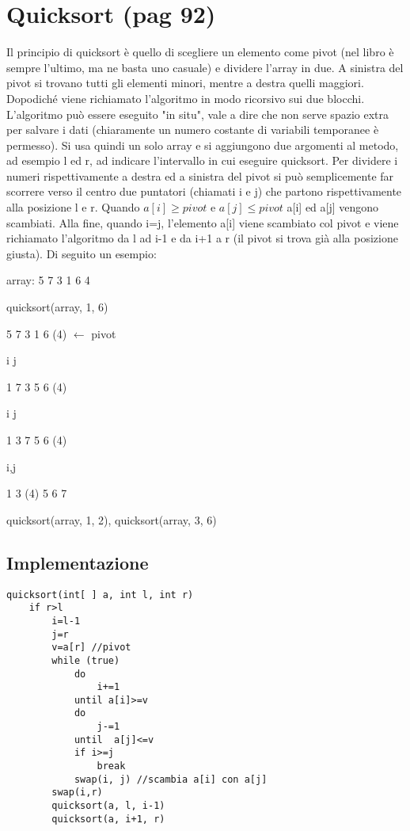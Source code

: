 \documentclass[a4paper]{book}
\begin{document}
\section{Quicksort (pag 92)}
Il principio di quicksort è quello di scegliere un elemento come pivot (nel libro è sempre l'ultimo, ma ne basta uno casuale) e dividere l'array in due. A sinistra del pivot si trovano tutti gli elementi minori, mentre a destra quelli maggiori. Dopodiché viene richiamato l'algoritmo in modo ricorsivo sui due blocchi. L'algoritmo può essere eseguito "in situ", vale a dire che non serve spazio extra per salvare i dati (chiaramente un numero costante di variabili temporanee è permesso). Si usa quindi un solo array e si aggiungono due argomenti al metodo, ad esempio l ed r, ad indicare l'intervallo in cui eseguire quicksort. Per dividere i numeri rispettivamente a destra ed a sinistra del pivot si può semplicemente far scorrere verso il centro due puntatori (chiamati i e j) che partono rispettivamente alla posizione l e r. Quando $a[i] \geq pivot$ e $a[j] \leq pivot$ a[i] ed a[j] vengono scambiati. Alla fine, quando i=j, l'elemento a[i] viene scambiato col pivot e viene richiamato l'algoritmo da l ad i-1 e da i+1 a r (il pivot si trova già alla posizione giusta). Di seguito un esempio:

array: 5 7 3 1 6 4

quicksort(array, 1, 6)

5 7 3 1 6 (4) $\leftarrow$ pivot

i\hspace{2em}       j 

1 7 3 5 6 (4)

\hspace{0.8em}  i j
  
1 3 7 5 6 (4)

\hspace{1,3em}   i,j
   
1 3 (4) 5 6 7

quicksort(array, 1, 2), quicksort(array, 3, 6)
      
\subsection*{Implementazione}

\begin{lstlisting}
quicksort(int[ ] a, int l, int r)
	if r>l
		i=l-1
		j=r
		v=a[r] //pivot
		while (true)
			do
				i+=1
			until a[i]>=v
			do
				j-=1
			until  a[j]<=v
			if i>=j
				break
			swap(i, j) //scambia a[i] con a[j]
	 	swap(i,r)
		quicksort(a, l, i-1)
		quicksort(a, i+1, r)
\end{lstlisting}    
      
\end{document}
